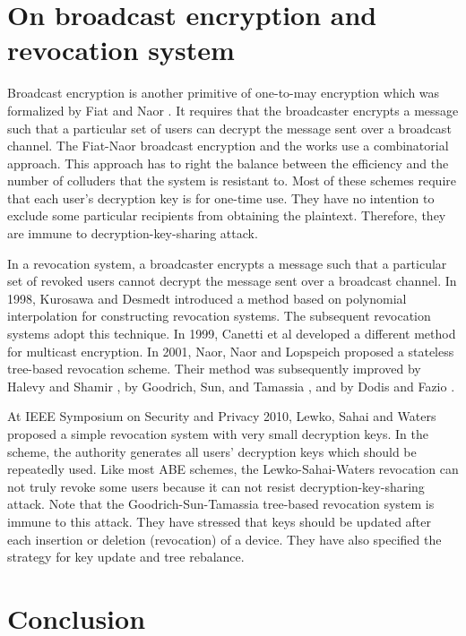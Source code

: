 \documentclass[11pt]{article}
\begin{document}
\section{On broadcast encryption and revocation system}

Broadcast encryption is another primitive of one-to-may encryption which was formalized by Fiat and Naor \cite{FN93}.
It requires that the broadcaster encrypts a message such that a particular
set of users can decrypt the message sent over a broadcast channel.
The Fiat-Naor broadcast encryption and the works \cite{GSW00,GSY99,KRS99,S97,ST98} use a combinatorial
approach. This approach  has to right the  balance between the efficiency and the number of colluders that the system is resistant to.
Most of these schemes require that each user's decryption key is for one-time use. They have no intention to exclude some particular recipients from obtaining the plaintext.
Therefore, they are immune to decryption-key-sharing attack.

In a revocation system, a broadcaster encrypts a message such that a particular
set of revoked users cannot decrypt the message sent over a broadcast channel. In 1998, Kurosawa and Desmedt \cite{KD98} introduced a method based on polynomial interpolation for constructing revocation systems.
The subsequent revocation systems \cite{NP00,Y05} adopt this technique. In 1999, Canetti et al \cite{C99,CMN99}
developed a different method for multicast encryption. In 2001,  Naor, Naor and Lopspeich \cite{NNL01} proposed a stateless tree-based revocation scheme. Their method was subsequently improved by Halevy and Shamir \cite{HS02},  by Goodrich, Sun, and Tamassia \cite{GST04}, and by Dodis and Fazio \cite{DF02}.

At IEEE Symposium on Security and Privacy 2010, Lewko, Sahai and Waters \cite{LSW10} proposed a simple revocation  system with very small decryption keys.
  In the scheme, the authority generates all users' decryption keys which should be repeatedly used. Like most ABE schemes, the Lewko-Sahai-Waters revocation can not
   truly revoke some users because it can not resist decryption-key-sharing attack.  Note that the Goodrich-Sun-Tamassia tree-based revocation system \cite{GST04} is immune to this attack. They have stressed
that keys should be updated after each insertion or deletion (revocation) of a device. They have also specified the strategy for key update and tree rebalance.


\section{Conclusion}
\end{document}
